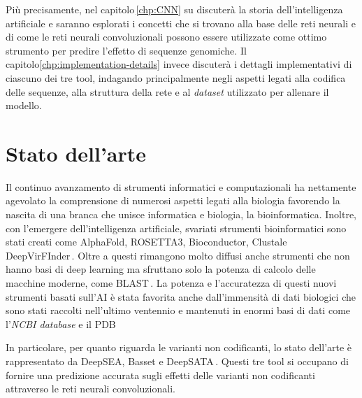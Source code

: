 Più precisamente, nel capitolo\,\ref{chp:CNN} su discuterà la storia dell'intelligenza artificiale e saranno esplorati i concetti che si trovano alla base delle reti neurali e di come le reti neurali convoluzionali possono essere utilizzate come ottimo strumento per predire l'effetto di sequenze genomiche. Il capitolo\ref{chp:implementation-details} invece discuterà i dettagli implementativi di ciascuno dei tre tool, indagando principalmente negli aspetti legati alla codifica delle sequenze, alla struttura della rete e al \textsl{dataset} utilizzato per allenare il modello.

\section{Stato dell'arte}

Il continuo avanzamento di strumenti informatici e computazionali ha nettamente agevolato la comprensione di numerosi aspetti legati alla biologia favorendo la nascita di una branca che unisce informatica e biologia, la bioinformatica. Inoltre, con l'emergere dell'intelligenza artificiale, svariati strumenti bioinformatici sono stati creati come AlphaFold, ROSETTA3, Bioconductor, Clustale  DeepVirFInder\,\cite{jumper2021highly, leaver2011rosetta3, gentleman2004bioconductor, larkin2007clustal, ren2020identifying}. Oltre a questi rimangono molto diffusi anche strumenti che non hanno basi di deep learning ma sfruttano solo la potenza di calcolo delle macchine moderne, come BLAST\,\cite{altschul1990basic}. La potenza e l'accuratezza di questi nuovi strumenti basati sull'AI è stata favorita anche dall'immensità di dati biologici che sono stati raccolti nell'ultimo ventennio e mantenuti in enormi basi di dati come l'\textit{NCBI database} e il PDB\,\cite{sherry2001dbsnp, burley2017protein}

In particolare, per quanto riguarda le varianti non codificanti, lo stato dell'arte è rappresentato da DeepSEA, Basset e DeepSATA\,\cite{zhou2015predicting, kelley2016basset, ma2023deepsata}. Questi tre tool si occupano di fornire una predizione accurata sugli effetti delle varianti non codificanti attraverso le reti neurali convoluzionali.




